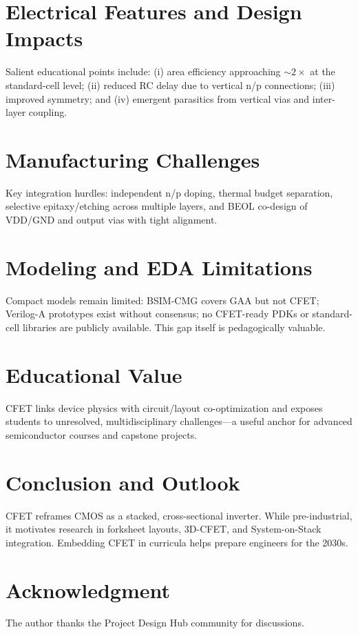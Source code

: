 \documentclass[conference]{IEEEtran}
\begin{document}
\section{Electrical Features and Design Impacts}
Salient educational points include: (i) area efficiency approaching
$\sim\!2\times$ at the standard-cell level; (ii) reduced RC delay due
to vertical n/p connections; (iii) improved symmetry; and (iv)
emergent parasitics from vertical vias and inter-layer coupling.

\section{Manufacturing Challenges}
Key integration hurdles: independent n/p doping, thermal budget
separation, selective epitaxy/etching across multiple layers, and
BEOL co-design of VDD/GND and output vias with tight alignment.

\section{Modeling and EDA Limitations}
Compact models remain limited: BSIM-CMG covers GAA but not CFET;
Verilog-A prototypes exist without consensus; no CFET-ready PDKs or
standard-cell libraries are publicly available. This gap itself is
pedagogically valuable.

\section{Educational Value}
CFET links device physics with circuit/layout co-optimization and
exposes students to unresolved, multidisciplinary challenges---a
useful anchor for advanced semiconductor courses and capstone projects.

\section{Conclusion and Outlook}
CFET reframes CMOS as a stacked, cross-sectional inverter. While
pre-industrial, it motivates research in forksheet layouts, 3D-CFET,
and System-on-Stack integration. Embedding CFET in curricula helps
prepare engineers for the 2030s.

\section*{Acknowledgment}
The author thanks the Project Design Hub community for discussions.
\end{document}

